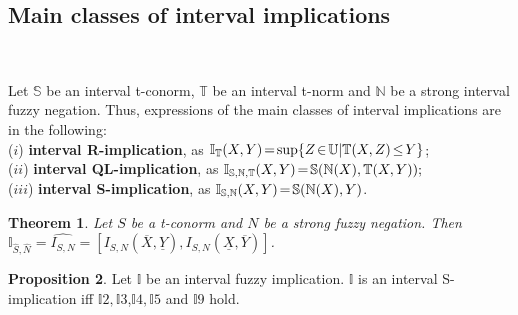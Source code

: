 \documentclass[12pt]{article}
\theoremstyle{plain}
\newtheorem{theorem}{Theorem}[section]
\theoremstyle{remark}
\theoremstyle{definition}
\theoremstyle{proposition}
\newtheorem{proposition}[theorem]{Proposition}
\newcommand{\II}{\mathbb{I} }
\newcommand{\UU}{\mathbb{U} }
\newcommand{\NN}{\mathbb{N} }
\newcommand{\TT}{\mathbb{T} }
\newcommand{\Ss}{\mathbb{S} }
\begin{document}
\subsection{Main classes of interval implications}~\label{subsec_int_class}

Let $\mathbb{S}$ be an interval t-conorm, $\mathbb{T}$ be an interval t-norm and $\NN$ be a strong interval fuzzy negation. Thus, expressions of the main classes of interval implications are in the following:\\
($i$) \hspace{-0.1cm}\textbf{interval R-implication}, as $\II_{\mathbb{T}}(X,Y)\hspace{-0.05cm}=\hspace{-0.05cm}\sup\{Z\hspace{-0.05cm}\in\hspace{-0.05cm} \UU|\TT(X,Z)\hspace{-0.05cm}\leq\hspace{-0.05cm}Y\}$;\\
($ii$)\hspace{-0.1cm} \textbf{interval QL-implication}, as $\II_{\Ss,\NN,\TT}(X,Y)\hspace{-0.05cm}=\hspace{-0.05cm}\Ss(\NN(X),\TT(X,Y));$\\
($iii$)\hspace{-0.1cm} \textbf{interval S-implication}, as $\II_{\Ss,\NN}(X,Y)\hspace{-0.05cm}=\hspace{-0.05cm}\Ss(\NN(X),Y)$.

\begin{theorem}\cite[Theorem 24]{Bed10b}\label{teo-S-imp-BIR}
Let $S$ be a t-conorm and $N$ be a strong fuzzy negation. Then
$\II_{\widehat{S},\widehat{N}}=\widehat{I_{S,N}}= [I_{S,N}(\overline{X},\underline{Y}), I_{S,N}(\underline{X},\overline{Y})]$.
\end{theorem}

\begin{proposition}\cite[Theorem 29]{Bed10b}\label{pro-int-simp-prop-3}
Let $\II$ be an interval fuzzy implication.  $\II$ is an interval S-implication iff $\II2,\II3$,$\II4,\II5$ and $\II9$ hold.
\end{proposition}
\end{document}
